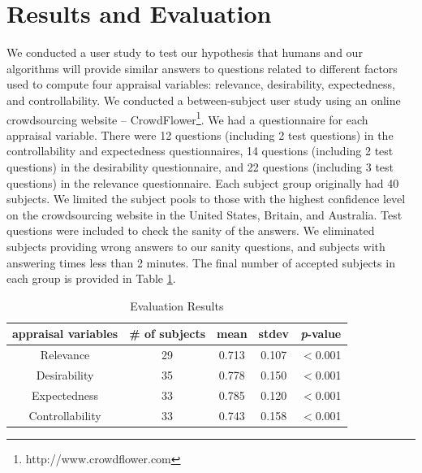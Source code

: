 \documentclass[12pt]{report}
\begin{document}
\section{Results and Evaluation}
\label{sec:results-evaluation}
\vspace*{-3mm}
We conducted a user study to test our hypothesis that humans and our algorithms
will provide similar answers to questions related to different factors used
to compute four appraisal variables: relevance, desirability, expectedness, and
controllability. We conducted a between-subject user study using an online
crowdsourcing website -- CrowdFlower\footnote{http://www.crowdflower.com}. We
had a questionnaire for each appraisal variable. There were 12 questions
(including 2 test questions) in the controllability and expectedness
questionnaires, 14 questions (including 2 test questions) in the desirability
questionnaire, and 22 questions (including 3 test questions) in the relevance
questionnaire. Each subject group originally had 40 subjects. We limited the
subject pools to those with the highest confidence level on the crowdsourcing
website in the United States, Britain, and Australia. Test questions were
included to check the sanity of the answers. We eliminated subjects providing
wrong answers to our sanity questions, and subjects with answering times less
than 2 minutes. The final number of accepted subjects in each group is provided
in Table \ref{tbl:statistics}.

\begin{table}[htbp]
\vspace*{-3mm}
\centering
\caption{Evaluation Results}
\begin{tabular}{|c|c|c|c|c|} \hline
appraisal variables & \# of subjects & mean & stdev & \textit{p}-value\\ \hline 
Relevance &  29 & 0.713 & 0.107 & $<$0.001\\ \hline
Desirability & 35 & 0.778 & 0.150 & $<$0.001\\ \hline 
Expectedness & 33 & 0.785 & 0.120 & $<$0.001\\ \hline 
Controllability & 33 & 0.743 & 0.158 & $<$0.001\\ \hline
\end{tabular}
\label{tbl:statistics}
\vspace*{-3mm}
\end{table}
\end{document}
